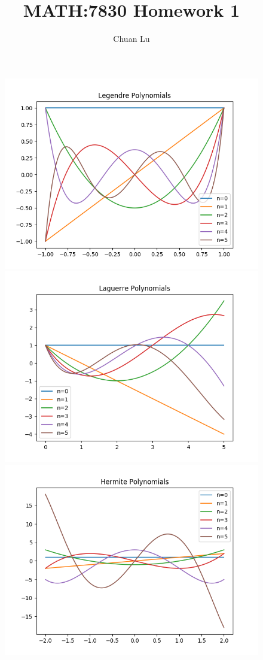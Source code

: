 \documentclass{article}
\begin{document}
\author{Chuan Lu}
\title{MATH:7830 Homework 1}
\maketitle


\begin{figure}[h]
\centering
\vbox{
\includegraphics[scale=0.35]{Images/legendre.png}
\includegraphics[scale=0.35]{Images/laguerre.png}
} 
\vbox{
\includegraphics[scale=0.35]{Images/hermite.png}
}
\end{figure}
\end{document}
